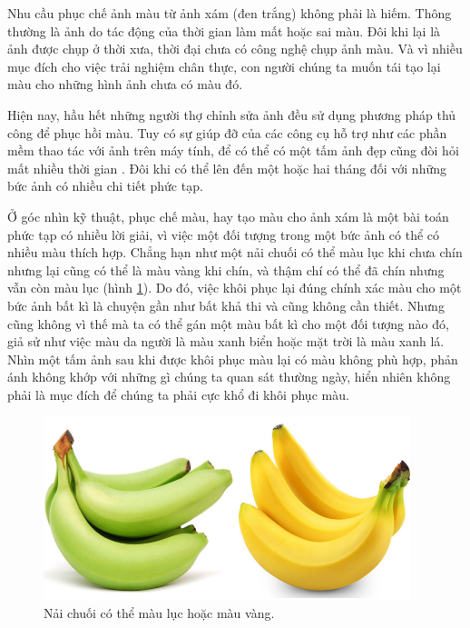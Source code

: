 \documentclass[a4paper, 12pt]{report}
\begin{document}
Nhu cầu phục chế ảnh màu từ ảnh xám (đen trắng) không phải là hiếm.
Thông thường là ảnh do tác động của thời gian làm mất hoặc sai màu.
Đôi khi lại là ảnh được chụp ở thời xưa, thời đại chưa có công nghệ chụp ảnh màu.
Và vì nhiều mục đích cho việc trải nghiệm chân thực, con người chúng ta muốn tái tạo lại màu cho những hình ảnh chưa có màu đó.\vspace{5pt}

Hiện nay, hầu hết những người thợ chỉnh sửa ảnh đều sử dụng phương pháp thủ công để phục hồi màu.
Tuy có sự giúp đỡ của các công cụ hỗ trợ như các phần mềm thao tác với ảnh trên máy tính, để có thể có một tấm ảnh đẹp cũng đòi hỏi mất nhiều thời gian \cite{replytime2colorize2012}.
Đôi khi có thể lên đến một hoặc hai tháng đối với những bức ảnh có nhiều chi tiết phức tạp.\vspace{5pt}

Ở góc nhìn kỹ thuật, phục chế màu, hay tạo màu cho ảnh xám là một bài toán phức tạp có nhiều lời giải, vì việc một đối tượng trong một bức ảnh có thể có nhiều màu thích hợp.
Chẳng hạn như một nải chuối có thể màu lục khi chưa chín nhưng lại cũng có thể là màu vàng khi chín, và thậm chí có thể đã chín nhưng vẫn còn màu lục (hình \ref{fig:banana}).
Do đó, việc khôi phục lại đúng chính xác màu cho một bức ảnh bất kì là chuyện gần như bất khả thi và cũng không cần thiết.
Nhưng cũng không vì thế mà ta có thể gán một màu bất kì cho một đối tượng nào đó, giả sử như việc màu da người là màu xanh biển hoặc mặt trời là màu xanh lá.
Nhìn một tấm ảnh sau khi được khôi phục màu lại có màu không phù hợp, phản ánh không khớp với những gì chúng ta quan sát thường ngày, hiển nhiên không phải là mục đích để chúng ta phải cực khổ đi khôi phục màu.\vspace{5pt}

\begin{figure}
\includegraphics[width=10.7cm]{images/1_1.jpg} 
\caption{Nải chuối có thể màu lục hoặc màu vàng.}
\label{fig:banana}
\end{figure}
\end{document}
